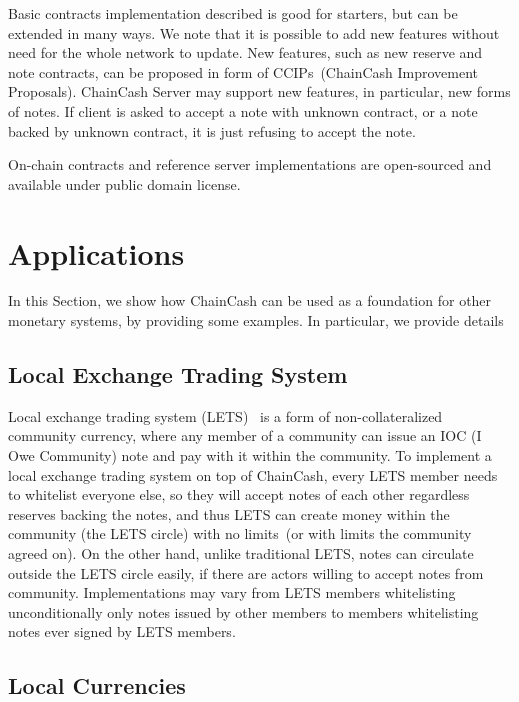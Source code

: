 \documentclass{llncs}   %
\newcommand{\authnote}[2]{\marginpar{\parbox{\marginparwidth}{\tiny %
  \textsf{#1 {\textcolor{blue}{notes: #2}}}}}%
  \textcolor{blue}{\textbf{\dag}}}
\newcommand{\authnote}[2]{
  \textsf{#1 \textcolor{blue}{: #2}}}
\newcommand{\authnote}[2]{}
\newcommand{\knote}[1]{{\authnote{\textcolor{green}{kushti notes}}{#1}}}
\newcommand{\cc}{ChainCash}
\begin{document}

Basic contracts implementation described is good for starters, but can be extended in many ways.  We note that it is possible
to add new features without need for the whole network to update. New features, such as new reserve and note contracts,
can be proposed in form of CCIPs~(ChainCash Improvement Proposals). ChainCash
Server may support new features, in particular, new forms of notes. If client is asked to accept a note with unknown
contract, or a note backed by unknown contract, it is just refusing to accept the note.

On-chain contracts and reference server implementations are open-sourced and available under public domain license.

\section{Applications}
\label{sec-apps}

In this Section, we show how \cc{} can be used as a foundation for other monetary systems, by providing some examples.
In particular, we provide details \knote{finish}

\subsection{Local Exchange Trading System}

Local exchange trading system (LETS)~\cite{williams1996new} is a form of non-collateralized community currency, where any member of a community
can issue an IOC (I Owe Community) note and pay with it within the community.
To implement a local exchange trading system on top of \cc{}, every LETS member needs to whitelist everyone else, so
they will accept notes of each other regardless reserves backing the notes, and thus LETS can create money within the community (the LETS circle) with no limits~(or with limits the community agreed on). On the other hand, unlike traditional LETS, notes can circulate outside the LETS circle easily, if there are actors willing to accept notes from community. Implementations may vary from LETS members whitelisting unconditionally only notes issued by other members to members whitelisting notes ever signed by LETS members.


\subsection{Local Currencies}
\end{document}
